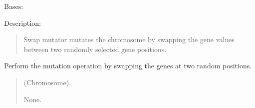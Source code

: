 \documentclass[letterpaper,10pt,english]{sphinxmanual}
\begin{document}
\begin{fulllineitems}
\label{\detokenize{pygenalgo.operators.mutation:pygenalgo.operators.mutation.swap_mutator.SwapMutator}}
\pysigstartsignatures
{}
\pysigstopsignatures
\sphinxAtStartPar
Bases: {\hyperref[\detokenize{pygenalgo.operators.mutation:pygenalgo.operators.mutation.mutate_operator.MutationOperator}]{}}

\sphinxAtStartPar
Description:
\begin{quote}

\sphinxAtStartPar
Swap mutator mutates the chromosome by swapping the gene
values between two randomly selected gene positions.
\end{quote}

\begin{fulllineitems}
\label{\detokenize{pygenalgo.operators.mutation:pygenalgo.operators.mutation.swap_mutator.SwapMutator.mutate}}
\pysigstartsignatures
{}
\pysigstopsignatures
\sphinxAtStartPar
Perform the mutation operation by swapping the genes at two random positions.
\begin{quote}\begin{description}
\sphinxAtStartPar
{} \textendash{} (Chromosome).

\sphinxAtStartPar
None.

\end{description}\end{quote}

\end{fulllineitems}


\end{fulllineitems}
\end{document}
